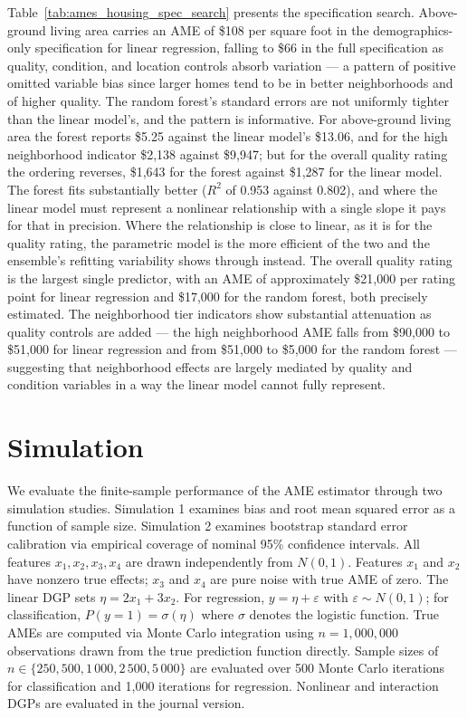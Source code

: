 \documentclass[conference]{IEEEtran}
\begin{document}
	Table~\ref{tab:ames_housing_spec_search} presents the specification search. Above-ground living area carries an AME of \$108 per square foot in the demographics-only specification for linear regression, falling to \$66 in the full specification as quality, condition, and location controls absorb variation --- a pattern of positive omitted variable bias since larger homes tend to be in better neighborhoods and of higher quality. The random forest's standard errors are not uniformly tighter than the linear model's, and the pattern is informative. For above-ground living area the forest reports \$5.25 against the linear model's \$13.06, and for the high neighborhood indicator \$2{,}138 against \$9{,}947; but for the overall quality rating the ordering reverses, \$1{,}643 for the forest against \$1{,}287 for the linear model. The forest fits substantially better ($R^2$ of 0.953 against 0.802), and where the linear model must represent a nonlinear relationship with a single slope it pays for that in precision. Where the relationship is close to linear, as it is for the quality rating, the parametric model is the more efficient of the two and the ensemble's refitting variability shows through instead. The overall quality rating is the largest single predictor, with an AME of approximately \$21,000 per rating point for linear regression and \$17,000 for the random forest, both precisely estimated. The neighborhood tier indicators show substantial attenuation as quality controls are added --- the high neighborhood AME falls from \$90,000 to \$51,000 for linear regression and from \$51,000 to \$5,000 for the random forest --- suggesting that neighborhood effects are largely mediated by quality and condition variables in a way the linear model cannot fully represent.
	
	\section{Simulation}
	
	We evaluate the finite-sample performance of the AME estimator through two simulation studies. Simulation 1 examines bias and root mean squared error as a function of sample size. Simulation 2 examines bootstrap standard error calibration via empirical coverage of nominal 95\% confidence intervals. All features $x_1, x_2, x_3, x_4$ are drawn independently from $N(0,1)$. Features $x_1$ and $x_2$ have nonzero true effects; $x_3$ and $x_4$ are pure noise with true AME of zero. The linear DGP sets $\eta = 2x_1 + 3x_2$. For regression, $y = \eta + \varepsilon$ with $\varepsilon \sim N(0,1)$; for classification, $P(y=1) = \sigma(\eta)$ where $\sigma$ denotes the logistic function. True AMEs are computed via Monte Carlo integration using $n = 1{,}000{,}000$ observations drawn from the true prediction function directly. Sample sizes of $n \in \{250, 500, 1{\,}000, 2{\,}500, 5{\,}000\}$ are evaluated over 500 Monte Carlo iterations for classification and 1{,}000 iterations for regression. Nonlinear and interaction DGPs are evaluated in the journal version.
	
\end{document}
